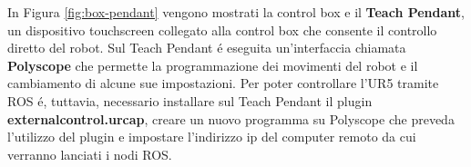 In Figura \ref{fig:box-pendant} vengono mostrati la control box e il \textbf{Teach Pendant}, un dispositivo touchscreen collegato 
alla control box che consente il controllo diretto del robot. Sul Teach Pendant \'{e} eseguita un'interfaccia chiamata \textbf{Polyscope} 
che permette la programmazione dei movimenti del robot e il cambiamento di alcune sue impostazioni. 
Per poter controllare l'UR5 tramite ROS \'{e}, tuttavia, necessario installare sul Teach Pendant il plugin \textbf{externalcontrol.urcap}, 
creare un nuovo programma su Polyscope che preveda l'utilizzo del plugin e impostare l'indirizzo ip del computer remoto da cui 
verranno lanciati i nodi ROS.
